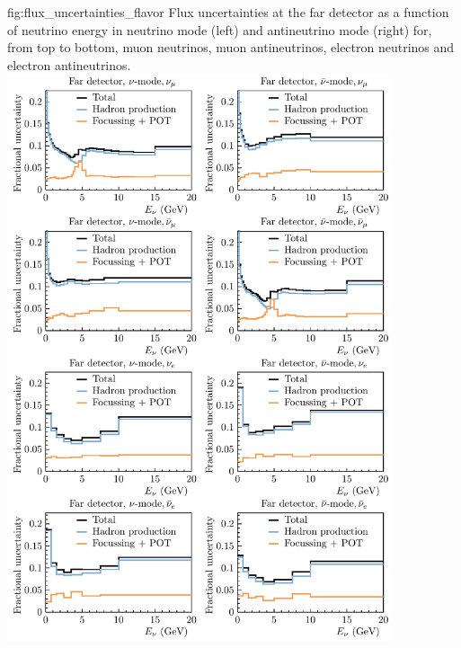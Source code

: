 \begin{dunefigure}{fig:flux_uncertainties_flavor}
{Flux uncertainties at the far detector as a function of neutrino energy in neutrino mode (left) and antineutrino mode (right) for, from top to bottom, muon neutrinos, muon antineutrinos, electron neutrinos and electron antineutrinos. }
    \includegraphics[width=0.85\textwidth]{graphics/HP_NonHP_FD_allspec_ErrBreakdown.pdf}

    \end{dunefigure}




